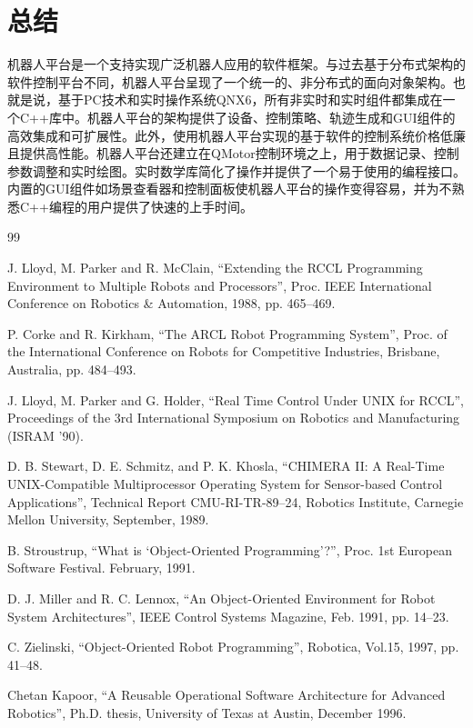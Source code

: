 \documentclass[UTF8,a4paper,12pt]{ctexart}
\begin{document}
\section{总结}

机器人平台是一个支持实现广泛机器人应用的软件框架。与过去基于分布式架构的软件控制平台不同，机器人平台呈现了一个统一的、非分布式的面向对象架构。也就是说，基于PC技术和实时操作系统QNX6，所有非实时和实时组件都集成在一个C++库中。机器人平台的架构提供了设备、控制策略、轨迹生成和GUI组件的高效集成和可扩展性。此外，使用机器人平台实现的基于软件的控制系统价格低廉且提供高性能。机器人平台还建立在QMotor控制环境之上，用于数据记录、控制参数调整和实时绘图。实时数学库简化了操作并提供了一个易于使用的编程接口。内置的GUI组件如场景查看器和控制面板使机器人平台的操作变得容易，并为不熟悉C++编程的用户提供了快速的上手时间。

\begin{thebibliography}{99}

 J. Lloyd, M. Parker and R. McClain, ``Extending the RCCL Programming Environment to Multiple Robots and Processors'', Proc. IEEE International Conference on Robotics \& Automation, 1988, pp. 465--469.

 P. Corke and R. Kirkham, ``The ARCL Robot Programming System'', Proc. of the International Conference on Robots for Competitive Industries, Brisbane, Australia, pp. 484--493.

 J. Lloyd, M. Parker and G. Holder, ``Real Time Control Under UNIX for RCCL'', Proceedings of the 3rd International Symposium on Robotics and Manufacturing (ISRAM '90).

 D. B. Stewart, D. E. Schmitz, and P. K. Khosla, ``CHIMERA II: A Real-Time UNIX-Compatible Multiprocessor Operating System for Sensor-based Control Applications'', Technical Report CMU-RI-TR-89--24, Robotics Institute, Carnegie Mellon University, September, 1989.

 B. Stroustrup, ``What is `Object-Oriented Programming'?'', Proc. 1st European Software Festival. February, 1991.

 D. J. Miller and R. C. Lennox, ``An Object-Oriented Environment for Robot System Architectures'', IEEE Control Systems Magazine, Feb. 1991, pp. 14--23.

 C. Zielinski, ``Object-Oriented Robot Programming'', Robotica, Vol.15, 1997, pp. 41--48.

 Chetan Kapoor, ``A Reusable Operational Software Architecture for Advanced Robotics'', Ph.D. thesis, University of Texas at Austin, December 1996.


\end{thebibliography}
\end{document}
